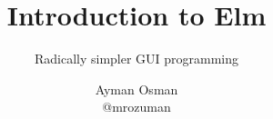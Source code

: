 \documentclass{beamer}
\title{Introduction to Elm}
\subtitle{Radically simpler GUI programming}
\author[Ayman Osman]{
  Ayman Osman
  \\ @mrozuman
}
\begin{document}
\begin{frame}
  \titlepage
\end{frame}




\end{document}
